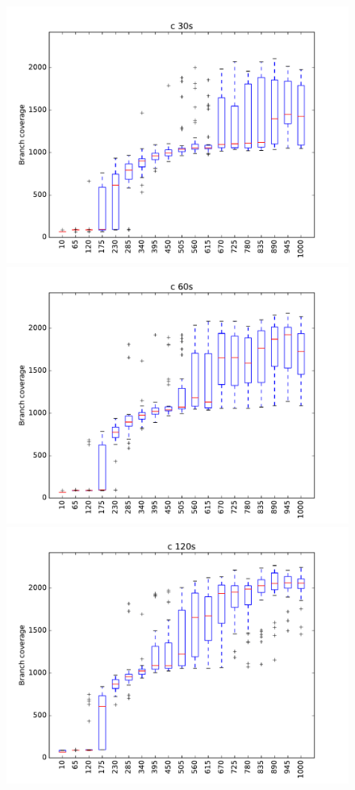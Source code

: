 \begin{figure}
\includegraphics[width=\columnwidth]{graphs/Crand30}
\includegraphics[width=\columnwidth]{graphs/Crand60}
\includegraphics[width=\columnwidth]{graphs/Crand120}
\end{figure}


